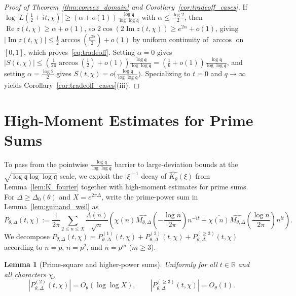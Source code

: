 \documentclass[11pt,a4paper]{amsart}
\newtheorem{lemma}[theorem]{Lemma}
\theoremstyle{remark}
\numberwithin{equation}{section}
\newcommand{\R}{\mathbb{R}}
\newcommand{\q}{\mathfrak{q}}
\begin{document}
\begin{proof}[Proof of Theorem~\ref{thm:convex_domain} and Corollary~\ref{cor:tradeoff_cases}]
If $\log|L(\frac{1}{2}+it,\chi)| \ge (\alpha+o(1))\frac{\log\q}{\log\log\q}$ with $\alpha \le \frac{\log 2}{2}$, then $\operatorname{Re} z(t,\chi) \ge \alpha + o(1)$, so $2\cos(2\operatorname{Im} z(t,\chi)) \ge e^{2\alpha}+o(1)$, giving $|\operatorname{Im} z(t,\chi)| \le \frac{1}{2}\arccos(\frac{e^{2\alpha}}{2})+o(1)$ by uniform continuity of $\arccos$ on $[0,1]$, which proves~\eqref{eq:tradeoff}. Setting $\alpha = 0$ gives $|S(t,\chi)| \le (\frac{1}{2\pi}\arccos(\frac{1}{2})+o(1))\frac{\log\q}{\log\log\q} = (\frac{1}{6}+o(1))\frac{\log\q}{\log\log\q}$, and setting $\alpha = \frac{\log 2}{2}$ gives $S(t,\chi) = o\bigl(\frac{\log\q}{\log\log\q}\bigr)$. Specializing to $t = 0$ and $q \to \infty$ yields Corollary~\ref{cor:tradeoff_cases}(iii).
\end{proof}

\section{High-Moment Estimates for Prime Sums}\label{sec:moments}

To pass from the pointwise $\frac{\log\q}{\log\log\q}$ barrier to large-deviation bounds at the $\sqrt{\log\q\log\log\q}$ scale, we exploit the $|\xi|^{-1}$ decay of $\widehat{K_\theta}(\xi)$ from Lemma~\ref{lem:K_fourier} together with high-moment estimates for prime sums. For $\Delta \ge \Delta_0(\theta)$ and $X = e^{2\pi\Delta}$, write the prime-power sum in Lemma~\ref{lem:guinand_weil} as
\[
  P_{\theta,\Delta}(t,\chi) := \frac{1}{2\pi}\sum_{2\le n\le X} \frac{\Lambda(n)}{\sqrt{n}}\left(\chi(n)\widehat{M_{\theta,\Delta}}\!\left(-\frac{\log n}{2\pi}\right)n^{-it} + \overline{\chi(n)}\widehat{M_{\theta,\Delta}}\!\left(\frac{\log n}{2\pi}\right)n^{it}\right).
\]
We decompose $P_{\theta,\Delta}(t,\chi) = P_{\theta,\Delta}^{(1)}(t,\chi) + P_{\theta,\Delta}^{(2)}(t,\chi) + P_{\theta,\Delta}^{(\ge 3)}(t,\chi)$ according to $n = p$, $n = p^2$, and $n = p^m$ ($m \ge 3$).

\begin{lemma}[Prime-square and higher-power sums]\label{lem:prime_powers}
Uniformly for all $t \in \R$ and all characters $\chi$,
\[
  |P_{\theta,\Delta}^{(2)}(t,\chi)| = O_\theta(\log\log X), \qquad |P_{\theta,\Delta}^{(\ge 3)}(t,\chi)| = O_\theta(1).
\]
\end{lemma}
\end{document}
